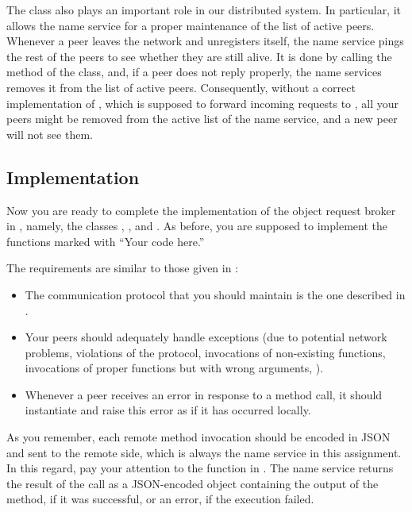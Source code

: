 \documentclass[a4paper]{article}
\begin{document}
The  class also plays an important role in our distributed
system. In particular, it allows the name service for a proper maintenance of
the list of active peers. Whenever a peer leaves the network and unregisters
itself, the name service pings the rest of the peers to see whether they are
still alive. It is done by calling the  method of the
 class, and, if a peer does not reply properly, the name
services removes it from the list of active peers. Consequently, without a
correct implementation of , which is supposed to forward
incoming requests to , all your peers might be removed from the
active list of the name service, and a new peer will not see them.

\subsection{Implementation}
Now you are ready to complete the implementation of the object request broker in
, namely, the classes , ,
and . As before, you are supposed to implement the functions
marked with ``Your code here.''

The requirements are similar to those given in :
\begin{itemize}

  \item The communication protocol that you should maintain is the one described
  in .

  \item Your peers should adequately handle exceptions (due to potential network
  problems, violations of the protocol, invocations of non-existing functions,
  invocations of proper functions but with wrong arguments, \etc).

  \item Whenever a peer receives an error in response to a method call, it
  should instantiate and raise this error as if it has occurred locally.

\end{itemize}
As you remember, each remote method invocation should be encoded in JSON and
sent to the remote side, which is always the name service in this assignment. In
this regard, pay your attention to the  function in
. The name service returns the result of the call as a
JSON-encoded object containing the output of the method, if it was successful,
or an error, if the execution failed.
\end{document}
